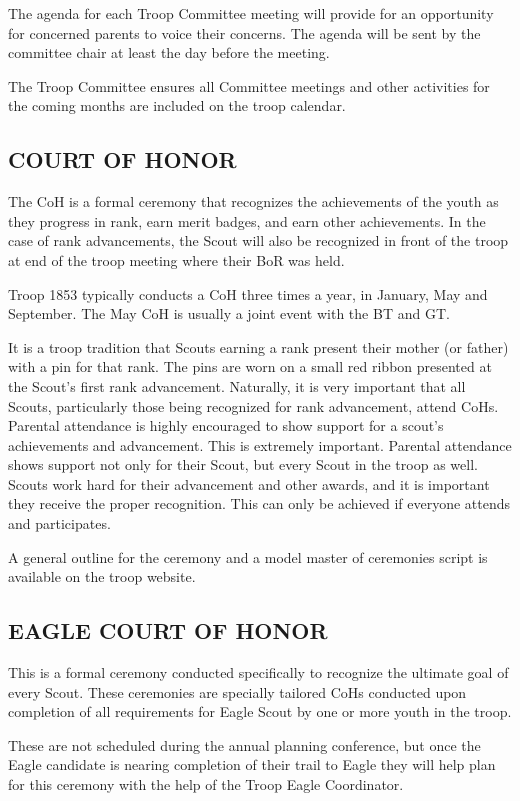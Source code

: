 \documentclass{ltxguide}
\begin{document}
The agenda for each Troop Committee meeting will provide for an opportunity for concerned parents to voice their concerns. The agenda will be sent by the committee chair at least the day before the meeting.

The Troop Committee ensures all Committee meetings and other activities for the coming months are included on the troop calendar.

\subsection{COURT OF HONOR}
The \ac{CoH} is a formal ceremony that recognizes the achievements of the youth as they progress in rank, earn merit badges, and earn other achievements. In the case of rank advancements, the Scout will also be recognized in front of the troop at end of the troop meeting where their \ac{BoR} was held.

Troop 1853 typically conducts a \ac{CoH} three times a year, in January, May and September. The May \ac{CoH} is usually a joint event with the \ac{BT} and \ac{GT}.

It is a troop tradition that Scouts earning a rank present their mother (or father) with a pin for that rank. The pins are worn on a small red ribbon presented at the Scout's first rank advancement. Naturally, it is very important that all Scouts, particularly those being recognized for rank advancement, attend \acp{CoH}.  Parental attendance is highly encouraged to show support for a scout's achievements and advancement. This is extremely important. Parental attendance shows support not only for their Scout, but every Scout in the troop as well. Scouts work hard for their advancement and other awards, and it is important they receive the proper recognition. This can only be achieved if everyone attends and participates.

A general outline for the ceremony and a model master of ceremonies script is available on the troop website.

\subsection{EAGLE COURT OF HONOR}
This is a formal ceremony conducted specifically to recognize the ultimate goal of every Scout. These ceremonies are specially tailored \acp{CoH} conducted upon completion of all requirements for Eagle Scout by one or more youth in the troop.

These are not scheduled during the annual planning conference, but once the Eagle candidate is nearing completion of their trail to Eagle they will help plan for this ceremony with the help of the Troop Eagle Coordinator.
\end{document}
